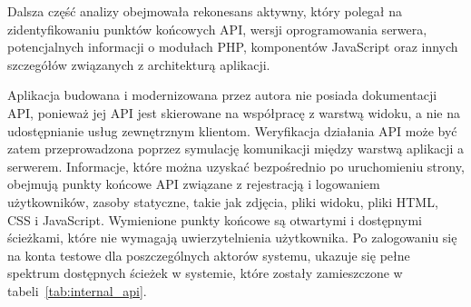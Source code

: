 \documentclass[12pt,twoside]{book}
\begin{document}
    Dalsza część analizy obejmowała rekonesans aktywny, który polegał na zidentyfikowaniu punktów końcowych API, wersji oprogramowania serwera, potencjalnych informacji o modułach PHP, komponentów JavaScript oraz innych szczegółów związanych z architekturą aplikacji.

    Aplikacja budowana i modernizowana przez autora nie posiada dokumentacji API, ponieważ jej API jest skierowane na współpracę z warstwą widoku, a nie na udostępnianie usług zewnętrznym klientom. Weryfikacja działania API może być zatem przeprowadzona poprzez symulację komunikacji między warstwą aplikacji a serwerem. Informacje, które można uzyskać bezpośrednio po uruchomieniu strony, obejmują punkty końcowe API związane z rejestracją i logowaniem użytkowników, zasoby statyczne, takie jak zdjęcia, pliki widoku, pliki HTML, CSS i JavaScript. Wymienione punkty końcowe są otwartymi i dostępnymi ścieżkami, które nie wymagają uwierzytelnienia użytkownika. Po zalogowaniu się na konta testowe dla poszczególnych aktorów systemu, ukazuje się pełne spektrum dostępnych ścieżek w systemie, które zostały zamieszczone w tabeli~\ref{tab:internal_api}.
\end{document}
